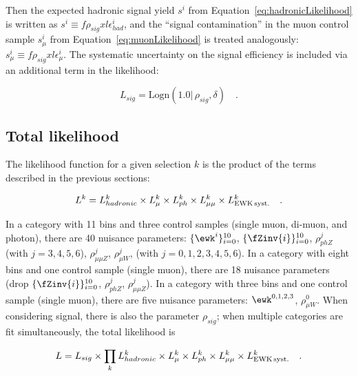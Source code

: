 Then the expected hadronic signal yield $s^i$ from
Equation~\ref{eq:hadronicLikelihood} is written as $s^i \equiv
f\rho_{sig} xl\epsilon_{had}^i$, and the ``signal contamination'' in
the muon control sample $s_{\mu}^i$ from
Equation~\ref{eq:muonLikelihood} is treated analogously: $s_{\mu}^i
\equiv f\rho_{sig} xl\epsilon_{\mu}^i$.  The systematic uncertainty on
the signal efficiency is included via an additional term in the
likelihood:

\begin{equation}
L_{sig}=\mathrm{Logn}(1.0 |\,\rho_{sig}, \delta) \quad .
\end{equation}

\subsection{Total likelihood}
\label{sec:totalLikelihood}

The likelihood function for a given selection $k$ is the product of
the terms described in the previous sections:

\begin{equation}
L^k = L_{hadronic}^k \times L_{\mu}^k \times L_{ph}^k \times
L_{\mu\mu}^k\times L_{\rm EWK\, syst.}^k \quad .
\end{equation}

In a category with 11 \HT bins and three control samples (single muon,
di-muon, and photon), there are 40 nuisance parameters:
$\{\ewk^{i}\}_{i=0}^{10}$, $\{\fZinv{i}\}_{i=0}^{10}$, $\rho_{phZ}^j$
(with $j=3,4,5,6$), $\rho_{\mu\mu Z}^j$, $\rho_{\mu W}^j$, (with
$j=0,1,2,3,4,5,6$).  In a category with eight \HT bins and one control
sample (single muon), there are 18 nuisance parameters (drop
$\{\fZinv{i}\}_{i=0}^{10}$, $\rho_{phZ}^j$, $\rho_{\mu\mu Z}^j$).  In
a category with three \HT bins and one control sample (single muon),
there are five nuisance parameters: $\ewk^{0,1,2,3}$, $\rho_{\mu
  W}^0$.  When considering signal, there is also the parameter
$\rho_{sig}$; when multiple categories are fit simultaneously, the
total likelihood is


\begin{equation}
L = L_{sig}\times \prod_k L_{hadronic}^k
\times L_{\mu}^k \times L_{ph}^k \times L_{\mu\mu}^k \times L_{\rm EWK\, syst.}^k \quad .
\end{equation}

